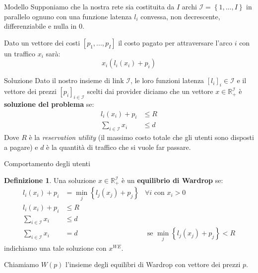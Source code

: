 \documentclass{beamer}
\newcounter{counter1}
\theoremstyle{plain}
\theoremstyle{definition}
\newtheorem{mydef}[counter1]{Definizione}
\theoremstyle{remark}
\newcommand{\set}[1]{\left\{#1\right\}}
\newcommand{\pa}[1]{\left(#1\right)}
\newcommand{\bra}[1]{\left[#1\right]}
\begin{document}
\begin{frame}{Modello}
  Supponiamo che la nostra rete sia costituita da $I$ archi
  $\mathcal{I} = \set{1,...,I}$ in parallelo ognuno con una funzione
  latenza $l_i$ convessa, non decrescente, differenziabile e nulla in
  $0$.

  Dato un vettore dei costi $\bra{p_1,...,p_I}$ il costo pagato per
  attraversare l'arco $i$ con un traffico $x_i$ sarà:
  \[ x_i \pa{ l_i(x_i) + p_i} \]

  \begin{center}
  \end{center}
\end{frame}

\begin{frame}{Soluzione}
  Dato il nostro insieme di link $\mathcal{I}$, le loro funzioni
  latenza $\bra{l_i}_i\in\mathcal{I}$ e il vettore dei prezzi
  $\bra{p_i}_{i\in\mathcal{I}}$ scelti dai provider diciamo che un
  vettore $x\in \mathbb{R}_+^\mathcal{I}$ è \textbf{soluzione del
    problema} se:
  \begin{align*}
    l_i(x_i) + p_i &\le R \\
    \sum _{i\in \mathcal{I}} x_i &\le d 
  \end{align*}
  Dove $R$ è la \textit{reservation utility} (il massimo costo totale
  che gli utenti sono disposti a pagare) e $d$ è la quantità di
  traffico che si vuole far passare.
\end{frame}

\begin{frame}{Comportamento degli utenti}
  \begin{mydef}
    Una soluzione $x\in \mathbb{R}_+^\mathcal{I}$ è un
    \textbf{equilibrio di Wardrop} se:
    \begin{align*}
      l_i(x_i) + p_i &= \min _j \set{l_j(x_j)+p_j} & \forall i\text{ con } x_i>0 \\
      l_i(x_i) + p_i &\le R \\
      \sum _{i\in \mathcal{I}} x_i &\le d \\
      \sum _{i\in \mathcal{I}} x_i &= d & \text { se } \min _j
                                          \set{l_j(x_j)+p_j} <R
    \end{align*}
    indichiamo una tale soluzione con $x^{WE}$.
  \end{mydef}
  Chiamiamo $W(p)$ l'insieme degli equilibri di Wardrop con vettore
  dei prezzi $p$.
\end{frame}
\end{document}
